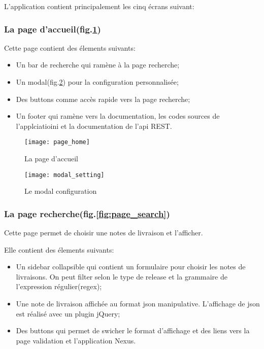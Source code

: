 L'application contient principalement les cinq écrans suivant:

\subsubsection{La page d'accueil(fig.\ref{fig:page_home})}
Cette page contient des élements suivants:
\begin{itemize}
 \item Un bar de recherche qui ramène à la page recherche;
 \item Un modal(fig.\ref{fig:modal_setting}) pour la configuration personnalisée;
 \item Des buttons comme accès rapide vers la page recherche;
 \item Un footer qui ramène vers la documentation, les codes sources de l'applciatioini et la documentation de l'api REST.
\end{itemize}

\begin{figure}[ht]
 \centering
 \texttt{[image: page\_home]}
 \caption{La page d'accueil}
 \label{fig:page_home}
\end{figure}

\begin{figure}[ht]
 \centering
 \texttt{[image: modal\_setting]}
 \caption{Le modal configuration}
 \label{fig:modal_setting}
\end{figure}

\subsubsection{La page recherche(fig.\ref{fig:page_search})}
Cette page permet de choisir une notes de livraison et l'afficher.

Elle contient des élements suivants:
\begin{itemize}
 \item Un sidebar collapsible qui contient un formulaire pour choisir les notes de livraisons. On peut filter selon le type de release et la grammaire de l'expression régulier(regex);
 \item Une note de livraison affichée au format json manipulative. L'affichage de json est réalisé avec un plugin jQuery;
 \item Des buttons qui permet de swicher le format d'affichage et des liens vers la page validation et l'application Nexus.
\end{itemize}

